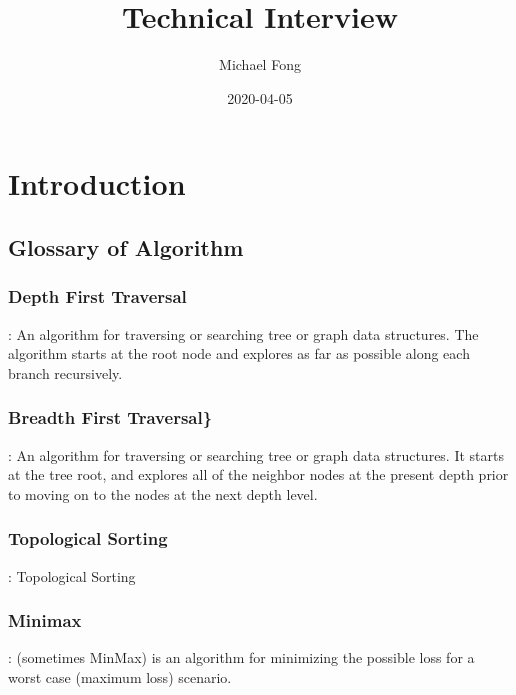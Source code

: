 \documentclass[]{book}
\title{Technical Interview}
\author{Michael Fong}
\date{2020-04-05}
\begin{document}
\maketitle


{
\setcounter{tocdepth}{1}
\tableofcontents
}
\hypertarget{intro}{%
\chapter{Introduction}\label{intro}}

\hypertarget{glossary-of-algorithm}{%
\section{Glossary of Algorithm}\label{glossary-of-algorithm}}

\hypertarget{dfs}{%
\subsection{Depth First Traversal}\label{dfs}}

: An algorithm for traversing or searching tree or graph data structures. The algorithm starts
at the root node and explores as far as possible along each branch recursively.

\hypertarget{bfs}{%
\subsection{Breadth First Traversal\}}\label{bfs}}

: An algorithm for traversing or searching tree or graph data structures. It starts at the tree
root, and explores all of the neighbor nodes at the present depth prior to moving on to the nodes at the next
depth level.

\hypertarget{topological}{%
\subsection{Topological Sorting}\label{topological}}

: Topological Sorting

\hypertarget{minimax}{%
\subsection{Minimax}\label{minimax}}

: (sometimes MinMax) is an algorithm for minimizing the possible loss for a worst case
(maximum loss) scenario.
\end{document}
